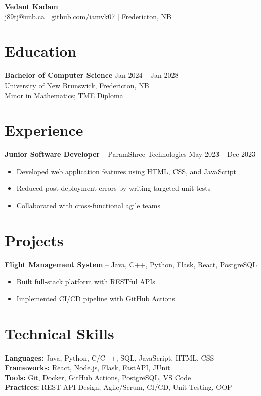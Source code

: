 \documentclass[11pt]{article}
\begin{document}
\begin{center}
\textbf{\Large Vedant Kadam} \\
\href{mailto:j89tj@unb.ca}{j89tj@unb.ca} |
\href{https://github.com/iamvk07}{github.com/iamvk07} |
Fredericton, NB
\end{center}

\section{Education}
\textbf{Bachelor of Computer Science} \hfill Jan 2024 -- Jan 2028 \\
University of New Brunswick, Fredericton, NB \\
Minor in Mathematics; TME Diploma

\section{Experience}
\textbf{Junior Software Developer} -- ParamShree Technologies \hfill May 2023 -- Dec 2023
\begin{itemize}
\item Developed web application features using HTML, CSS, and JavaScript
\item Reduced post-deployment errors by writing targeted unit tests
\item Collaborated with cross-functional agile teams
\end{itemize}

\section{Projects}
\textbf{Flight Management System} -- Java, C++, Python, Flask, React, PostgreSQL
\begin{itemize}
\item Built full-stack platform with RESTful APIs
\item Implemented CI/CD pipeline with GitHub Actions
\end{itemize}

\section{Technical Skills}
\textbf{Languages:} Java, Python, C/C++, SQL, JavaScript, HTML, CSS \\
\textbf{Frameworks:} React, Node.js, Flask, FastAPI, JUnit \\
\textbf{Tools:} Git, Docker, GitHub Actions, PostgreSQL, VS Code \\
\textbf{Practices:} REST API Design, Agile/Scrum, CI/CD, Unit Testing, OOP
\end{document}
